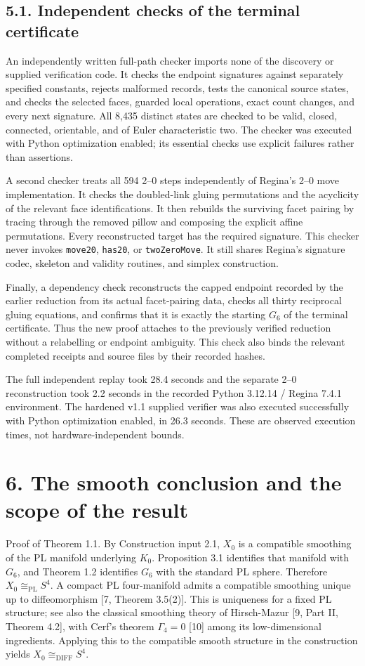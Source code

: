 \documentclass[11pt,letterpaper]{article}
\begin{document}
\subsection*{5.1. Independent checks of the terminal certificate}
An independently written full-path checker imports none of the discovery or supplied verification code. It checks the endpoint signatures against separately specified constants, rejects malformed records, tests the canonical source states, and checks the selected faces, guarded local operations, exact count changes, and every next signature. All 8,435 distinct states are checked to be valid, closed, connected, orientable, and of Euler characteristic two. The checker was executed with Python optimization enabled; its essential checks use explicit failures rather than assertions.

A second checker treats all 594 2--0 steps independently of Regina's 2--0 move implementation. It checks the doubled-link gluing permutations and the acyclicity of the relevant face identifications. It then rebuilds the surviving facet pairing by tracing through the removed pillow and composing the explicit affine permutations. Every reconstructed target has the required signature. This checker never invokes {\small\texttt{move20}}, {\small\texttt{has20}}, or {\small\texttt{twoZeroMove}}. It still shares Regina's signature codec, skeleton and validity routines, and simplex construction.

Finally, a dependency check reconstructs the capped endpoint recorded by the earlier reduction from its actual facet-pairing data, checks all thirty reciprocal gluing equations, and confirms that it is exactly the starting $G_6$ of the terminal certificate. Thus the new proof attaches to the previously verified reduction without a relabelling or endpoint ambiguity. This check also binds the relevant completed receipts and source files by their recorded hashes.

The full independent replay took 28.4 seconds and the separate 2--0 reconstruction took 2.2 seconds in the recorded Python 3.12.14 / Regina 7.4.1 environment. The hardened v1.1 supplied verifier was also executed successfully with Python optimization enabled, in 26.3 seconds. These are observed execution times, not hardware-independent bounds.

\section*{6. The smooth conclusion and the scope of the result}
Proof of Theorem 1.1. By Construction input 2.1, $X_0$ is a compatible smoothing of the PL manifold underlying $K_0$. Proposition 3.1 identifies that manifold with $G_6$, and Theorem 1.2 identifies $G_6$ with the standard PL sphere. Therefore $X_0\cong_{\mathrm{PL}}S^4$. A compact PL four-manifold admits a compatible smoothing unique up to diffeomorphism [7, Theorem 3.5(2)]. This is uniqueness for a fixed PL structure; see also the classical smoothing theory of Hirsch-Mazur [9, Part II, Theorem 4.2], with Cerf's theorem $\Gamma_4=0$ [10] among its low-dimensional ingredients. Applying this to the compatible smooth structure in the construction yields $X_0\cong_{\mathrm{DIFF}}S^4$.
\end{document}
